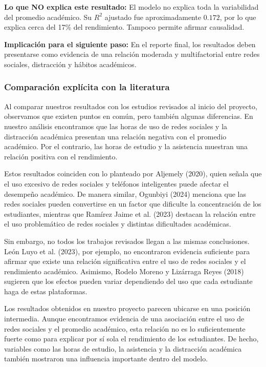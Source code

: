 \documentclass[12pt]{article}
\begin{document}
\begin{tcolorbox}[
colback=blue!5,
colframe=blue!75!black,
title=Ficha 9. Modelo seleccionado]
\textbf{Lo que NO explica este resultado:} El modelo no explica toda la variabilidad del promedio académico. Su $R^2$ ajustado fue aproximadamente $0.172$, por lo que explica cerca del 17\% del rendimiento. Tampoco permite afirmar causalidad.

\textbf{Implicación para el siguiente paso:} En el reporte final, los resultados deben presentarse como evidencia de una relación moderada y multifactorial entre redes sociales, distracción y hábitos académicos.
\end{tcolorbox}

\subsubsection*{Comparación explícita con la literatura}

Al comparar nuestros resultados con los estudios revisados al inicio del proyecto, observamos que existen puntos en común, pero también algunas diferencias. En nuestro análisis encontramos que las horas de uso de redes sociales y la distracción académica presentan una relación negativa con el promedio académico. Por el contrario, las horas de estudio y la asistencia muestran una relación positiva con el rendimiento.

Estos resultados coinciden con lo planteado por Aljemely (2020), quien señala que el uso excesivo de redes sociales y teléfonos inteligentes puede afectar el desempeño académico. De manera similar, Ogunbiyi (2024) menciona que las redes sociales pueden convertirse en un factor que dificulte la concentración de los estudiantes, mientras que Ramírez Jaime et al. (2023) destacan la relación entre el uso problemático de redes sociales y distintas dificultades académicas.

Sin embargo, no todos los trabajos revisados llegan a las mismas conclusiones. León Luyo et al. (2023), por ejemplo, no encontraron evidencia suficiente para afirmar que existe una relación significativa entre el uso de redes sociales y el rendimiento académico. Asimismo, Rodelo Moreno y Lizárraga Reyes (2018) sugieren que los efectos pueden variar dependiendo del uso que cada estudiante haga de estas plataformas.

Los resultados obtenidos en nuestro proyecto parecen ubicarse en una posición intermedia. Aunque encontramos evidencia de una asociación entre el uso de redes sociales y el promedio académico, esta relación no es lo suficientemente fuerte como para explicar por sí sola el rendimiento de los estudiantes. De hecho, variables como las horas de estudio, la asistencia y la distracción académica también mostraron una influencia importante dentro del modelo.
\end{document}
